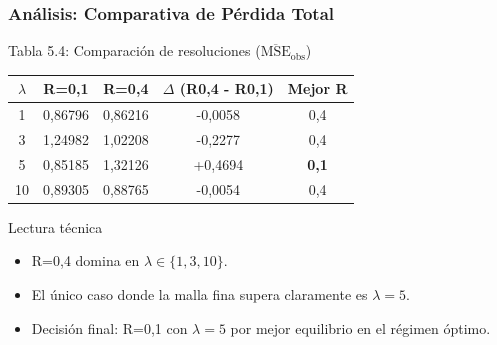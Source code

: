 \begin{frame}[fragile]
  \frametitle{Análisis: Comparativa de Pérdida Total}
  
  \begin{block}{Tabla 5.4: Comparación de resoluciones ($\overline{\text{MSE}}_{\text{obs}}$)}
    \scriptsize
    \centering
    \begin{tabular}{ccccc}
      \hline
      $\lambda$ & R=0,1 & R=0,4 & $\Delta$ (R0,4 - R0,1) & Mejor R \\
      \hline
      1  & 0,86796 & 0,86216 & -0,0058 & 0,4 \\
      3  & 1,24982 & 1,02208 & -0,2277 & 0,4 \\
      5  & 0,85185 & 1,32126 & +0,4694 & \textbf{0,1} \\
      10 & 0,89305 & 0,88765 & -0,0054 & 0,4 \\
      \hline
    \end{tabular}
  \end{block}

  \begin{block}{Lectura técnica}
    \begin{itemize}
      \small
      \item R=0,4 domina en $\lambda \in \{1,3,10\}$.
      \item El único caso donde la malla fina supera claramente es $\lambda = 5$.
      \item Decisión final: R=0,1 con $\lambda = 5$ por mejor equilibrio en el régimen óptimo.
    \end{itemize}
  \end{block}
  
\end{frame}

